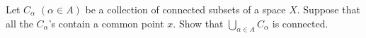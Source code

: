 Let $C_{\alpha}$ $(\alpha\in A)$ be a collection of connected subsets
of a space $X$. Suppose that all the $C_{\alpha}$'s contain a common
point $x$. Show that $\bigcup_{\alpha\in A} C_{\alpha}$ is connected.

